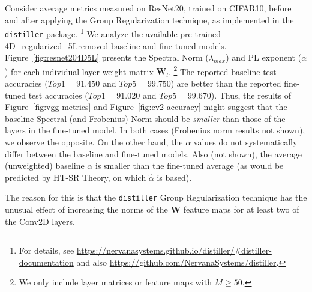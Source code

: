 Consider average metrics measured on ResNet20, trained on CIFAR10, before and after applying the Group Regularization technique, as implemented in the \texttt{distiller} package.%
\footnote{For details, see \url{https://nervanasystems.github.io/distiller/\#distiller-documentation} and also \url{https://github.com/NervanaSystems/distiller}.}
We analyze the available pre-trained 4D\_regularized\_5Lremoved baseline and fine-tuned models.  %
Figure~\ref{fig:resnet204D5L} presents the Spectral Norm ($\lambda_{max}$) and PL exponent ($\alpha$) for each individual layer weight matrix $\mathbf{W}_{l}$.%
\footnote{We only include layer matrices or feature maps with $M\ge50$.}
The reported baseline test accuracies ($Top1=91.450$ and $Top5=99.750$) are better than the reported fine-tuned test accuracies ($Top1=91.020$ and $Top5=99.670$).
Thus, the results of Figure~\ref{fig:vgg-metrics} and Figure~\ref{fig:cv2-accuracy} might suggest that the baseline Spectral (and Frobenius) Norm should be \emph{smaller} than those of the layers in the fine-tuned model.
In both cases (Frobenius norm results not shown), we observe the opposite.
On the other hand, the $\alpha$ values do not systematically differ between the baseline and fine-tuned models.
Also (not shown), the average (unweighted) baseline $\alpha$ is smaller than the fine-tuned average (as would be predicted by HT-SR Theory, on which $\hat{\alpha}$ is based).

The reason for this is that the \texttt{distiller} Group Regularization technique has the unusual effect of increasing the norms of the $\mathbf{W}$ feature maps for at least two of the Conv2D layers.


